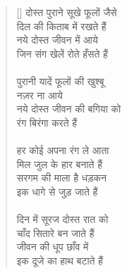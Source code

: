 \begin{verse}[\versewidth]\texthindi{
दोस्त पुराने सूखे फूलों जैसे\\
दिल की किताब में रखते हैं\\
नये दोस्त जीवन में आये\\
जिन संग खेलें रोते हँसते हैं\\
\\
पुरानी यादें फूलों की खुश्बू\\
नज़र ना आये\\
नये दोस्त जीवन की बगिया को\\
रंग बिरंगा करते हैं\\
\\
हर कोई अपना रंग ले आता\\
मिल जुल के हार बनाते हैं\\
सरगम की माला है धड़कन\\
इक धागे से जुड़ जाते हैं\\
\\
दिन में सूरज दोस्त रात को\\
चाँद सितारे बन जाते हैं\\
जीवन की धूप छाँव में\\
इक दूजे का हाथ बटाते हैं\\
}\end{verse}

